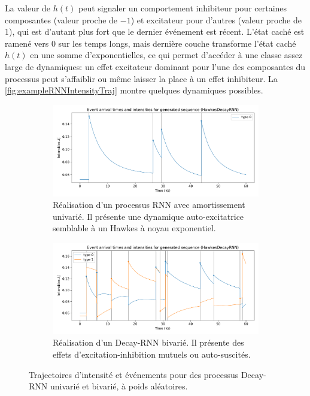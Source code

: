 \documentclass[../main.tex]{subfiles}
\begin{document}
La valeur de $h(t)$ peut signaler un comportement inhibiteur pour certaines composantes (valeur proche de $-1$) et excitateur pour d'autres (valeur proche de $1$), qui est d'autant plus fort que le dernier événement est récent. L'état caché est ramené vers $0$ sur les temps longs, mais dernière couche transforme l'état caché $h(t)$ en une somme d'exponentielles, ce qui permet d'accéder à une classe assez large de dynamiques: un effet excitateur dominant pour l'une des composantes du processus peut s'affaiblir ou même laisser la place à un effet inhibiteur. La \autoref{fig:exampleRNNIntensityTraj} montre quelques dynamiques possibles.

\begin{figure}[!ht]
	\begin{subfigure}{\linewidth}
		\includegraphics[width=\linewidth]{../notebooks/example_rnnplot.pdf}
		\caption{Réalisation d'un processus RNN avec amortissement univarié. Il présente une dynamique auto-excitatrice semblable à un Hawkes à noyau exponentiel.}
	\end{subfigure}
	\begin{subfigure}{\linewidth}
		\includegraphics[width=\linewidth]{../notebooks/example_rnnplot2d.pdf}
		\caption{Réalisation d'un Decay-RNN bivarié. Il présente des effets d'excitation-inhibition mutuels ou auto-suscités.}
	\end{subfigure}
	\caption{Trajectoires d'intensité et événements pour des processus Decay-RNN univarié et bivarié, à poids aléatoires.}\label{fig:exampleRNNIntensityTraj}
\end{figure}
\end{document}
